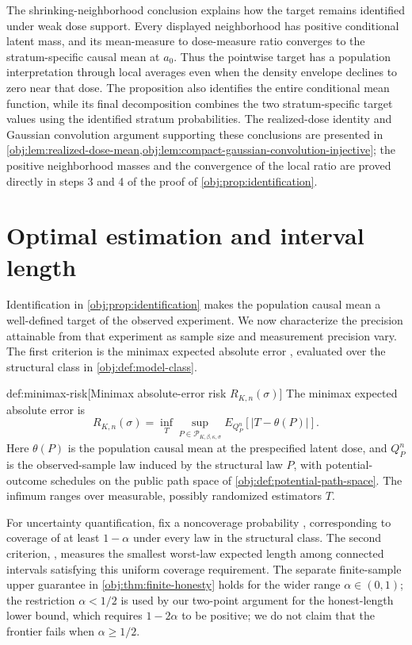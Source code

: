 \documentclass[11pt]{article}
\begin{document}
The shrinking-neighborhood conclusion explains how the target remains identified under weak dose support. Every displayed neighborhood has positive conditional latent mass, and its mean-measure to dose-measure ratio converges to the stratum-specific causal mean at \(a_0\). Thus the pointwise target has a population interpretation through local averages even when the density envelope declines to zero near that dose. The proposition also identifies the entire conditional mean function, while its final decomposition combines the two stratum-specific target values using the identified stratum probabilities. The realized-dose identity and Gaussian convolution argument supporting these conclusions are presented in \cref{obj:lem:realized-dose-mean,obj:lem:compact-gaussian-convolution-injective}; the positive neighborhood masses and the convergence of the local ratio are proved directly in steps 3 and 4 of the proof of \cref{obj:prop:identification}.


\section{Optimal estimation and interval length}

Identification in \cref{obj:prop:identification} makes the population causal mean a well-defined target of the observed experiment. We now characterize the precision attainable from that experiment as sample size and measurement precision vary. The first criterion is the minimax expected absolute error , evaluated over the structural class in \cref{obj:def:model-class}.

\begin{definitionv}{def:minimax-risk}[Minimax absolute-error risk $R_{K,n}(\sigma)$]
The minimax expected absolute error is
\[
R_{K,n}(\sigma)
=
\inf_T
\sup_{P\in\mathcal P_{K,\beta,\kappa,\sigma}}
E_{Q_P^n}\!\left[|T-\theta(P)|\right].
\]
Here \(\theta(P)\) is the population causal mean at the prespecified latent dose, and \(Q_P^n\) is the observed-sample law induced by the structural law \(P\), with potential-outcome schedules on the public path space of \cref{obj:def:potential-path-space}. The infimum ranges over measurable, possibly randomized estimators \(T\).
\end{definitionv}

For uncertainty quantification, fix a noncoverage probability , corresponding to coverage of at least \(1-\alpha\) under every law in the structural class. The second criterion, , measures the smallest worst-law expected length among connected intervals satisfying this uniform coverage requirement. The separate finite-sample upper guarantee in \cref{obj:thm:finite-honesty} holds for the wider range \(\alpha\in(0,1)\); the restriction \(\alpha<1/2\) is used by our two-point argument for the honest-length lower bound, which requires \(1-2\alpha\) to be positive; we do not claim that the frontier fails when \(\alpha\ge1/2\).
\end{document}
